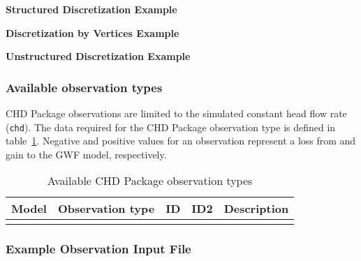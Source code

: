 \noindent \textbf{Structured Discretization Example}


\noindent \textbf{Discretization by Vertices Example}


\noindent \textbf{Unstructured Discretization Example}



\vspace{5mm}
\subsubsection{Available observation types}
CHD Package observations are limited to the simulated constant head flow rate (\texttt{chd}). The data required for the CHD Package observation type is defined in table~\ref{table:gwf-chdobstype}. Negative and positive values for an observation represent a loss from and gain to the GWF model, respectively.

\begin{longtable}{p{2cm} p{2.75cm} p{2cm} p{1.25cm} p{7cm}}
\caption{Available CHD Package observation types} \tabularnewline

\hline
\hline
\textbf{Model} & \textbf{Observation type} & \textbf{ID} & \textbf{ID2} & \textbf{Description} \\
\hline
\endhead

\hline
\endfoot


\label{table:gwf-chdobstype}
\end{longtable}

\vspace{5mm}
\subsubsection{Example Observation Input File}


